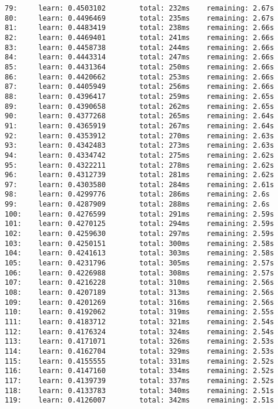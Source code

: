 \documentclass[11pt]{article}
\begin{document}
\begin{Verbatim}[commandchars=\\\{\}]
79:     learn: 0.4503102        total: 232ms    remaining: 2.67s
80:     learn: 0.4496469        total: 235ms    remaining: 2.67s
81:     learn: 0.4483419        total: 238ms    remaining: 2.66s
82:     learn: 0.4469401        total: 241ms    remaining: 2.66s
83:     learn: 0.4458738        total: 244ms    remaining: 2.66s
84:     learn: 0.4443314        total: 247ms    remaining: 2.66s
85:     learn: 0.4431364        total: 250ms    remaining: 2.66s
86:     learn: 0.4420662        total: 253ms    remaining: 2.66s
87:     learn: 0.4405949        total: 256ms    remaining: 2.66s
88:     learn: 0.4396417        total: 259ms    remaining: 2.65s
89:     learn: 0.4390658        total: 262ms    remaining: 2.65s
90:     learn: 0.4377268        total: 265ms    remaining: 2.64s
91:     learn: 0.4365919        total: 267ms    remaining: 2.64s
92:     learn: 0.4353912        total: 270ms    remaining: 2.63s
93:     learn: 0.4342483        total: 273ms    remaining: 2.63s
94:     learn: 0.4334742        total: 275ms    remaining: 2.62s
95:     learn: 0.4322211        total: 278ms    remaining: 2.62s
96:     learn: 0.4312739        total: 281ms    remaining: 2.62s
97:     learn: 0.4303580        total: 284ms    remaining: 2.61s
98:     learn: 0.4299776        total: 286ms    remaining: 2.6s
99:     learn: 0.4287909        total: 288ms    remaining: 2.6s
100:    learn: 0.4276599        total: 291ms    remaining: 2.59s
101:    learn: 0.4270125        total: 294ms    remaining: 2.59s
102:    learn: 0.4259630        total: 297ms    remaining: 2.59s
103:    learn: 0.4250151        total: 300ms    remaining: 2.58s
104:    learn: 0.4241613        total: 303ms    remaining: 2.58s
105:    learn: 0.4231796        total: 305ms    remaining: 2.57s
106:    learn: 0.4226988        total: 308ms    remaining: 2.57s
107:    learn: 0.4216228        total: 310ms    remaining: 2.56s
108:    learn: 0.4207189        total: 313ms    remaining: 2.56s
109:    learn: 0.4201269        total: 316ms    remaining: 2.56s
110:    learn: 0.4192062        total: 319ms    remaining: 2.55s
111:    learn: 0.4183712        total: 321ms    remaining: 2.54s
112:    learn: 0.4176324        total: 324ms    remaining: 2.54s
113:    learn: 0.4171071        total: 326ms    remaining: 2.53s
114:    learn: 0.4162704        total: 329ms    remaining: 2.53s
115:    learn: 0.4155555        total: 331ms    remaining: 2.52s
116:    learn: 0.4147160        total: 334ms    remaining: 2.52s
117:    learn: 0.4139739        total: 337ms    remaining: 2.52s
118:    learn: 0.4133783        total: 340ms    remaining: 2.51s
119:    learn: 0.4126007        total: 342ms    remaining: 2.51s

\end{Verbatim}
\end{document}

